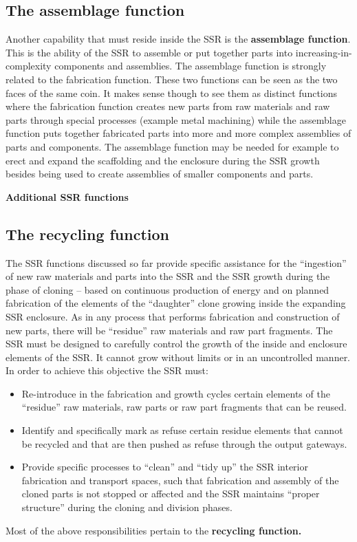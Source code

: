 \subsection[The assemblage function]{The assemblage function}
\hypertarget{RefHeading3076306210128}{}Another capability that must
reside inside the SSR is the \textbf{assemblage function}. This is the
ability of the SSR to assemble or put together parts into
increasing-in-complexity components and assemblies. The assemblage
function is strongly related to the fabrication function. These two
functions can be seen as the two faces of the same coin. It makes sense
though to see them as distinct functions where the fabrication function
creates new parts from raw materials and raw parts through special
processes (example metal machining) while the assemblage function puts
together fabricated parts into more and more complex assemblies of
parts and components. The assemblage function may be needed for example
to erect and expand the scaffolding and the enclosure during the SSR
growth besides being used to create assemblies of smaller components
and parts.


\bigskip


\bigskip

{\bfseries
\hypertarget{RefHeading3078306210128}{}Additional SSR functions}

\subsection[The recycling function]{The recycling function}
\hypertarget{RefHeading3080306210128}{}The SSR functions discussed so
far provide specific assistance for the “ingestion” of new raw
materials and parts into the SSR and the SSR growth during the phase of
cloning – based on continuous production of energy and on planned
fabrication of the elements of the “daughter” clone growing inside the
expanding SSR enclosure. As in any process that performs fabrication
and construction of new parts, there will be “residue” raw materials
and raw part fragments.  The SSR must be designed to carefully control
the growth of the inside and enclosure elements of the SSR. It cannot
grow without limits or in an uncontrolled manner. In order to achieve
this objective the SSR must:


\bigskip

\begin{itemize}
\item Re-introduce in the fabrication and growth cycles certain elements
of the “residue” raw materials, raw parts or raw part fragments that
can be reused.
\item Identify and specifically mark as refuse certain residue elements
that cannot be recycled and that are then pushed as refuse through the
output gateways.
\item Provide specific processes to “clean” and “tidy up” the SSR
interior fabrication and transport spaces, such that fabrication and
assembly of the cloned parts is not stopped or affected and the SSR
maintains “proper structure” during the cloning and division phases.
\end{itemize}
Most of the above responsibilities pertain to the \textbf{recycling
function.}


